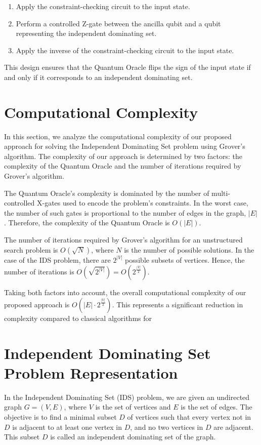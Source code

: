 \begin{enumerate}
    \item Apply the constraint-checking circuit to the input state.
    \item Perform a controlled Z-gate between the ancilla qubit and a qubit representing the independent dominating set.
    \item Apply the inverse of the constraint-checking circuit to the input state.
\end{enumerate}

This design ensures that the Quantum Oracle flips the sign of the input state if and only if it corresponds to an independent dominating set.

\section{Computational Complexity}
\label{sec:complexity}

In this section, we analyze the computational complexity of our proposed approach for solving the Independent Dominating Set problem using Grover's algorithm. The complexity of our approach is determined by two factors: the complexity of the Quantum Oracle and the number of iterations required by Grover's algorithm.

The Quantum Oracle's complexity is dominated by the number of multi-controlled X-gates used to encode the problem's constraints. In the worst case, the number of such gates is proportional to the number of edges in the graph, $|E|$. Therefore, the complexity of the Quantum Oracle is $O(|E|)$.

The number of iterations required by Grover's algorithm for an unstructured search problem is $O(\sqrt{N})$, where $N$ is the number of possible solutions. In the case of the IDS problem, there are $2^{|V|}$ possible subsets of vertices. Hence, the number of iterations is $O(\sqrt{2^{|V|}}) = O(2^{\frac{|V|}{2}})$.

Taking both factors into account, the overall computational complexity of our proposed approach is $O(|E| \cdot 2^{\frac{|V|}{2}})$. This represents a significant reduction in complexity compared to classical algorithms for

\section{Independent Dominating Set Problem Representation}

In the Independent Dominating Set (IDS) problem, we are given an undirected graph $G = (V, E)$, where $V$ is the set of vertices and $E$ is the set of edges. The objective is to find a minimal subset $D$ of vertices such that every vertex not in $D$ is adjacent to at least one vertex in $D$, and no two vertices in $D$ are adjacent. This subset $D$ is called an independent dominating set of the graph.


